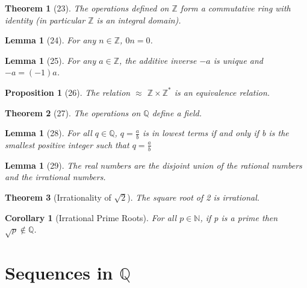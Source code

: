 \documentclass[12pt]{article}
\newtheorem*{thm*}{Theorem}
\newtheorem{lem}[thm]{Lemma}  %
\newtheorem{cor}[thm]{Corollary}
\newtheorem{prop}[thm]{Proposition}
\theoremstyle{definition}
\theoremstyle{remark}
\numberwithin{equation}{section}
\newcommand\Z{\mathbb Z}    %
\newcommand\N{\mathbb N}    %
\newcommand\Q{\mathbb Q}    %
\begin{document}
\begin{thm*}[23]
        The operations defined on $\Z$ form a commutative ring with identity (in particular $\Z$ is an integral domain).
\end{thm*}


\begin{lem}[24]
        For any $n \in \Z$, $0n = 0$.
\end{lem}


\begin{lem}[25]
        For any $a \in \Z$, the additive inverse $-a$ is unique and $-a = (-1)a$.
\end{lem}


\begin{prop}[26]
        The relation $\approx$ $\Z\times\Z^*$ is an equivalence relation.
\end{prop}



\begin{thm*}[27]
        The operations on $\Q$ define a field.
\end{thm*}



\begin{lem}[28]
        For all $q \in \Q$, $q = \frac{a}{b}$ is in lowest terms if and only if b is the smallest positive integer such that $q = \frac{a}{b}$
\end{lem}



\begin{lem}[29]
        The real numbers are the disjoint union of the rational numbers and the irrational numbers.
\end{lem}



\begin{thm*}[Irrationality of $\sqrt{2}$]
        The square root of 2 is irrational.
\end{thm*}


\begin{cor}[Irrational Prime Roots]
        For all $p \in \N$, if p is a prime then $\sqrt{p} \notin \Q$.
\end{cor}



\clearpage


\section{Sequences in $\Q$}
\end{document}

